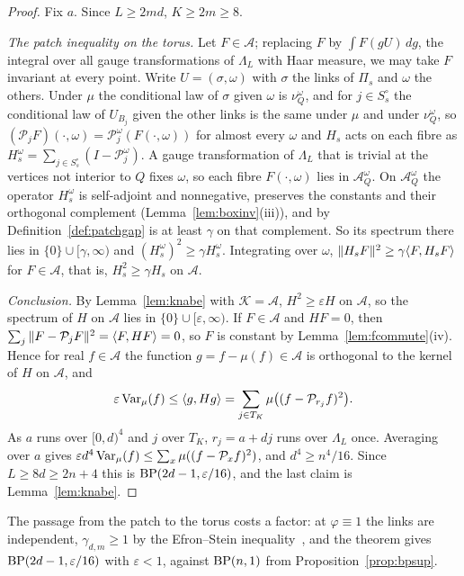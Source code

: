\begin{proof}
Fix $a$. Since $L\ge2md$, $K\ge2m\ge8$.

\emph{The patch inequality on the torus.} Let $F\in\mathcal A$; replacing $F$
by $\int F(gU)\,dg$, the integral over all gauge transformations of
$\Lambda_L$ with Haar measure, we may take $F$ invariant at every point.
Write $U=(\sigma,\omega)$ with $\sigma$ the links of $\Pi_s$ and $\omega$ the
others. Under $\mu$ the conditional law of $\sigma$ given $\omega$ is
$\nu^\omega_Q$, and for $j\in S^\circ_s$ the conditional law of $U_{B_j}$
given the other links is the same under $\mu$ and under $\nu^\omega_Q$, so
$(\mathcal P_jF)(\cdot,\omega)=\mathcal P^\omega_j(F(\cdot,\omega))$ for almost
every $\omega$ and $H_s$ acts on each fibre as $H^\omega_s=\sum_{j\in
S^\circ_s}(I-\mathcal P^\omega_j)$. A gauge transformation of $\Lambda_L$
that is trivial at the vertices not interior to $Q$ fixes $\omega$, so each
fibre $F(\cdot,\omega)$ lies in $\mathcal A^\omega_Q$. On $\mathcal
A^\omega_Q$ the operator $H^\omega_s$ is self-adjoint and nonnegative,
preserves the constants and their orthogonal complement
(Lemma~\ref{lem:boxinv}(iii)), and by Definition~\ref{def:patchgap} is at
least $\gamma$ on that complement. So its spectrum there lies in
$\{0\}\cup[\gamma,\infty)$ and $(H^\omega_s)^2\ge\gamma H^\omega_s$.
Integrating over $\omega$, $\|H_sF\|^2\ge\gamma\langle F,H_sF\rangle$ for $F\in
\mathcal A$, that is, $H_s^2\ge\gamma H_s$ on $\mathcal A$.

\emph{Conclusion.} By Lemma~\ref{lem:knabe} with $\mathcal K=\mathcal A$,
$H^2\ge\varepsilon H$ on $\mathcal A$, so the spectrum of $H$ on $\mathcal
A$ lies in $\{0\}\cup[\varepsilon,\infty)$. If $F\in\mathcal A$ and $HF=0$,
then $\sum_j\|F-\mathcal P_jF\|^2=\langle F,HF\rangle=0$, so $F$ is constant by
Lemma~\ref{lem:fcommute}(iv). Hence for real $f\in\mathcal A$ the function
$g=f-\mu(f)\in\mathcal A$ is orthogonal to the kernel of $H$ on $\mathcal
A$, and
\[
\varepsilon\operatorname{Var}_\mu(f)\le\langle g,Hg\rangle=\sum_{j\in T_K}\mu\bigl((f-\mathcal
P_{r_j}f)^2\bigr).
\]
As $a$ runs over $[0,d)^4$ and $j$ over $T_K$, $r_j=a+dj$ runs over
$\Lambda_L$ once. Averaging over $a$ gives $\varepsilon d^4\operatorname{Var}_\mu(f)\le
\sum_x\mu((f-\mathcal P_xf)^2)$, and $d^4\ge n^4/16$. Since $L\ge8d\ge2n+4$
this is $\mathrm{BP}(2d-1,\varepsilon/16)$, and the last claim is
Lemma~\ref{lem:knabe}.
\end{proof}

The passage from the patch to the torus costs a factor: at $\varphi\equiv1$
the links are independent, $\gamma_{d,m}\ge1$ by the Efron--Stein
inequality~\cite{ES81}, and the theorem gives $\mathrm{BP}(2d-1,\varepsilon/16)$
with $\varepsilon<1$, against $\mathrm{BP}(n,1)$ from Proposition~\ref{prop:bpsup}.

